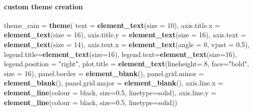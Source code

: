 \documentclass[
]{article}
\newenvironment{Shaded}{\begin{snugshade}}{\end{snugshade}}
\newcommand{\AttributeTok}[1]{\textcolor[rgb]{0.13,0.29,0.53}{#1}}
\newcommand{\DecValTok}[1]{\textcolor[rgb]{0.00,0.00,0.81}{#1}}
\newcommand{\FloatTok}[1]{\textcolor[rgb]{0.00,0.00,0.81}{#1}}
\newcommand{\FunctionTok}[1]{\textcolor[rgb]{0.13,0.29,0.53}{\textbf{#1}}}
\newcommand{\NormalTok}[1]{#1}
\newcommand{\OtherTok}[1]{\textcolor[rgb]{0.56,0.35,0.01}{#1}}
\newcommand{\StringTok}[1]{\textcolor[rgb]{0.31,0.60,0.02}{#1}}
\begin{document}
\hypertarget{custom-theme-creation}{%
\paragraph{custom theme creation}\label{custom-theme-creation}}

\begin{Shaded}
\begin{Highlighting}[]
\NormalTok{theme\_rain }\OtherTok{=} \FunctionTok{theme}\NormalTok{(}
\AttributeTok{text =} \FunctionTok{element\_text}\NormalTok{(}\AttributeTok{size =} \DecValTok{10}\NormalTok{),}
\AttributeTok{axis.title.x =} \FunctionTok{element\_text}\NormalTok{(}\AttributeTok{size =} \DecValTok{16}\NormalTok{),}
\AttributeTok{axis.title.y =} \FunctionTok{element\_text}\NormalTok{(}\AttributeTok{size =} \DecValTok{16}\NormalTok{),}
\AttributeTok{axis.text =} \FunctionTok{element\_text}\NormalTok{(}\AttributeTok{size =} \DecValTok{14}\NormalTok{),}
\AttributeTok{axis.text.x =} \FunctionTok{element\_text}\NormalTok{(}\AttributeTok{angle =} \DecValTok{0}\NormalTok{, }\AttributeTok{vjust =} \FloatTok{0.5}\NormalTok{),}
\AttributeTok{legend.title=}\FunctionTok{element\_text}\NormalTok{(}\AttributeTok{size=}\DecValTok{16}\NormalTok{),}
\AttributeTok{legend.text=}\FunctionTok{element\_text}\NormalTok{(}\AttributeTok{size=}\DecValTok{16}\NormalTok{),}
\AttributeTok{legend.position =} \StringTok{"right"}\NormalTok{,}
\AttributeTok{plot.title =} \FunctionTok{element\_text}\NormalTok{(}\AttributeTok{lineheight=}\NormalTok{.}\DecValTok{8}\NormalTok{, }\AttributeTok{face=}\StringTok{"bold"}\NormalTok{, }\AttributeTok{size =} \DecValTok{16}\NormalTok{),}
\AttributeTok{panel.border =} \FunctionTok{element\_blank}\NormalTok{(),}
\AttributeTok{panel.grid.minor =} \FunctionTok{element\_blank}\NormalTok{(),}
\AttributeTok{panel.grid.major =} \FunctionTok{element\_blank}\NormalTok{(),}
\AttributeTok{axis.line.x =} \FunctionTok{element\_line}\NormalTok{(}\AttributeTok{colour =} \StringTok{\textquotesingle{}black\textquotesingle{}}\NormalTok{, }\AttributeTok{size=}\FloatTok{0.5}\NormalTok{, }\AttributeTok{linetype=}\StringTok{\textquotesingle{}solid\textquotesingle{}}\NormalTok{),}
\AttributeTok{axis.line.y =} \FunctionTok{element\_line}\NormalTok{(}\AttributeTok{colour =} \StringTok{\textquotesingle{}black\textquotesingle{}}\NormalTok{, }\AttributeTok{size=}\FloatTok{0.5}\NormalTok{, }\AttributeTok{linetype=}\StringTok{\textquotesingle{}solid\textquotesingle{}}\NormalTok{))}
\end{Highlighting}
\end{Shaded}
\end{document}
